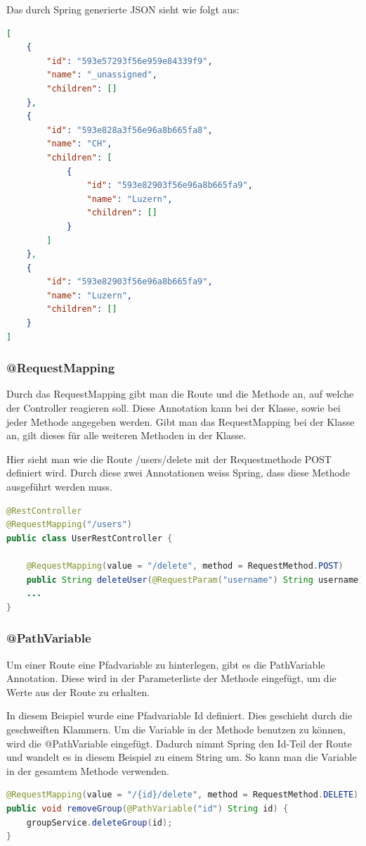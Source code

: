 Das durch Spring generierte JSON sieht wie folgt aus:
\begin{lstlisting}[language=json]
[
    {
        "id": "593e57293f56e959e84339f9",
        "name": "_unassigned",
        "children": []
    },
    {
        "id": "593e828a3f56e96a8b665fa8",
        "name": "CH",
        "children": [
            {
                "id": "593e82903f56e96a8b665fa9",
                "name": "Luzern",
                "children": []
            }
        ]
    },
    {
        "id": "593e82903f56e96a8b665fa9",
        "name": "Luzern",
        "children": []
    }
]
\end{lstlisting}

\subsubsection{@RequestMapping}
Durch das RequestMapping gibt man die Route und die Methode an, auf welche der Controller reagieren soll. Diese Annotation kann bei der Klasse, sowie bei jeder Methode angegeben werden. Gibt man das RequestMapping bei der Klasse an, gilt dieses für alle weiteren Methoden in der Klasse.

Hier sieht man wie die Route /users/delete mit der Requestmethode POST definiert wird. Durch diese zwei Annotationen weiss Spring, dass diese Methode ausgeführt werden muss.
\begin{lstlisting}[language=java]
@RestController
@RequestMapping("/users")
public class UserRestController {

	@RequestMapping(value = "/delete", method = RequestMethod.POST)
	public String deleteUser(@RequestParam("username") String username) {}
	...
}
\end{lstlisting}
\subsubsection{@PathVariable}
Um einer Route eine Pfadvariable zu hinterlegen, gibt es die PathVariable Annotation. Diese wird in der Parameterliste der Methode eingefügt, um die Werte aus der Route zu erhalten.

In diesem Beispiel wurde eine Pfadvariable Id definiert. Dies geschieht durch die geschweiften Klammern. Um die Variable in der Methode benutzen zu können, wird die @PathVariable eingefügt. Dadurch nimmt Spring den Id-Teil der Route und wandelt es in diesem Beispiel zu einem String um. So kann man die Variable in der gesamtem Methode verwenden.
\begin{lstlisting}[language=java]
@RequestMapping(value = "/{id}/delete", method = RequestMethod.DELETE)
public void removeGroup(@PathVariable("id") String id) {
	groupService.deleteGroup(id);
}
\end{lstlisting}
